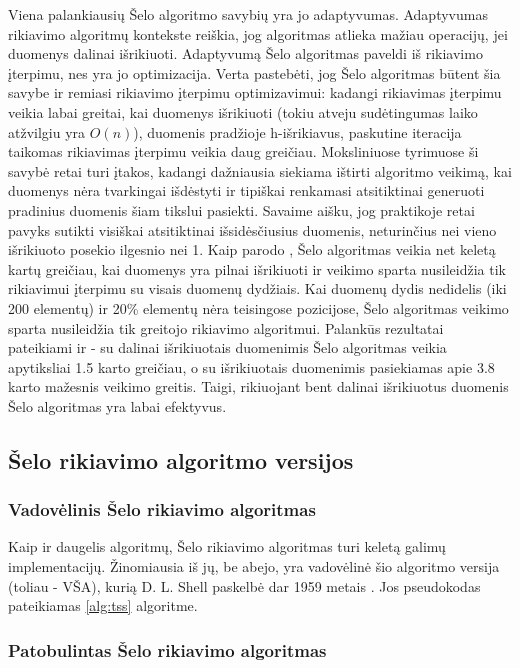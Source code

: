\documentclass{VUMIFInfKursinis}
\begin{document}
Viena palankiausių Šelo algoritmo savybių yra jo adaptyvumas.
Adaptyvumas rikiavimo algoritmų kontekste reiškia, jog algoritmas atlieka mažiau operacijų, jei duomenys dalinai išrikiuoti.
Adaptyvumą Šelo algoritmas paveldi iš rikiavimo įterpimu, nes yra jo optimizacija.
Verta pastebėti, jog Šelo algoritmas būtent šia savybe ir remiasi rikiavimo įterpimu optimizavimui:
kadangi rikiavimas įterpimu veikia labai greitai, kai duomenys išrikiuoti (tokiu atveju sudėtingumas laiko atžvilgiu yra $O(n)$),
duomenis pradžioje h-išrikiavus, paskutine iteracija taikomas rikiavimas įterpimu veikia daug greičiau.
Moksliniuose tyrimuose ši savybė retai turi įtakos, kadangi dažniausia siekiama ištirti algoritmo veikimą, kai duomenys
nėra tvarkingai išdėstyti ir tipiškai renkamasi atsitiktinai generuoti pradinius duomenis šiam tikslui pasiekti.
Savaime aišku, jog praktikoje retai pavyks sutikti visiškai atsitiktinai išsidėsčiusius duomenis, neturinčius nei vieno išrikiuoto posekio ilgesnio nei 1.
Kaip parodo \cite{10.1145/359024.359026}, Šelo algoritmas veikia net keletą kartų greičiau, kai duomenys yra pilnai
išrikiuoti ir veikimo sparta nusileidžia tik rikiavimui įterpimu su visais duomenų dydžiais.
Kai duomenų dydis nedidelis (iki 200 elementų) ir 20\% elementų nėra teisingose pozicijose, Šelo algoritmas veikimo sparta nusileidžia tik greitojo rikiavimo algoritmui.
Palankūs rezultatai pateikiami ir \cite{7280062} - su dalinai išrikiuotais duomenimis Šelo algoritmas veikia apytiksliai 1.5 karto greičiau, o su išrikiuotais
duomenimis pasiekiamas apie 3.8 karto mažesnis veikimo greitis.
Taigi, rikiuojant bent dalinai išrikiuotus duomenis Šelo algoritmas yra labai efektyvus.

\subsection{Šelo rikiavimo algoritmo versijos}

\subsubsection{Vadovėlinis Šelo rikiavimo algoritmas}

Kaip ir daugelis algoritmų, Šelo rikiavimo algoritmas turi keletą galimų implementacijų.
Žinomiausia iš jų, be abejo, yra vadovėlinė šio algoritmo versija (toliau - VŠA),
kurią D. L. Shell paskelbė dar 1959 metais \cite{shell1959high}.
Jos pseudokodas pateikiamas \ref{alg:tss} algoritme.

\subsubsection{Patobulintas Šelo rikiavimo algoritmas}
\end{document}
